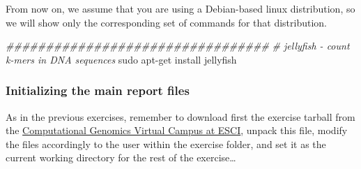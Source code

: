 \documentclass[10pt,a4paper,]{article}
\newenvironment{Shaded}{}{}
\newcommand{\BuiltInTok}[1]{#1}
\newcommand{\CommentTok}[1]{\textcolor[rgb]{0.38,0.63,0.69}{\textit{#1}}}
\newcommand{\ExtensionTok}[1]{#1}
\newcommand{\FunctionTok}[1]{\textcolor[rgb]{0.02,0.16,0.49}{#1}}
\newcommand{\KeywordTok}[1]{\textcolor[rgb]{0.00,0.44,0.13}{\textbf{#1}}}
\newcommand{\NormalTok}[1]{#1}
\newcommand{\VariableTok}[1]{\textcolor[rgb]{0.10,0.09,0.49}{#1}}
\begin{document}
From now on, we assume that you are using a Debian-based linux
distribution, so we will show only the corresponding set of commands for
that distribution.

\begin{Shaded}
\begin{Highlighting}[]
\CommentTok{#################################}
\CommentTok{# jellyfish - count k-mers in DNA sequences}
\FunctionTok{sudo}\NormalTok{ apt-get install jellyfish}
\end{Highlighting}
\end{Shaded}

\hypertarget{initializing-the-main-report-files}{%
\subsubsection{Initializing the main report
files}\label{initializing-the-main-report-files}}

As in the previous exercises, remember to download first the exercise
tarball from the
\href{https://aula.esci.upf.edu/course/view.php?id=5915}{Computational Genomics Virtual Campus at ESCI},
unpack this file, modify the files accordingly to the user within the
exercise folder, and set it as the current working directory for the
rest of the exercise\ldots{}

\begin{Shaded}
\end{Shaded}
\end{document}
